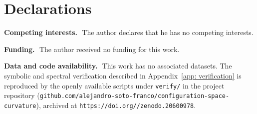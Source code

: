 \documentclass[12pt]{article}
\begin{document}
{\setlength{\parskip}{0pt}\tableofcontents}









\appendix


\section*{Declarations}

\noindent\textbf{Competing interests.}\ \,The author declares that he has no
competing interests.

\smallskip
\noindent\textbf{Funding.}\ \,The author received no funding for this work.

\smallskip
\noindent\textbf{Data and code availability.}\ \,This work has no associated
datasets. The symbolic and spectral verification described in
Appendix~\ref{app: verification} is reproduced by the openly available scripts
under \texttt{verify/} in the project repository
(\texttt{github.com/\allowbreak alejandro-soto-franco/\allowbreak configuration-space-curvature}),
archived at
\texttt{https://doi.org//\allowbreak zenodo.20600978}.

\printbibliography

\end{document}
